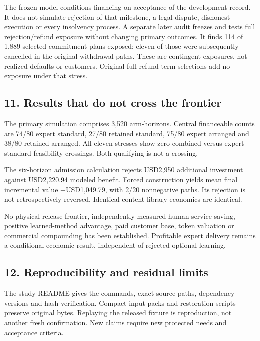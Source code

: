 \documentclass[
  10pt,
]{article}
\let\OriginalSubsection\subsection
\renewcommand{\subsection}{\needspace{6\baselineskip}\OriginalSubsection}
\begin{document}
The frozen model conditions financing on acceptance of the development
record. It does not simulate rejection of that milestone, a legal
dispute, dishonest execution or every insolvency process. A separate
later audit freezes and tests full rejection/refund exposure without
changing primary outcomes. It finds 114 of 1,889 selected commitment
plans exposed; eleven of those were subsequently cancelled in the
original withdrawal paths. These are contingent exposures, not realized
defaults or customers. Original full-refund-term selections add no
exposure under that stress.

\hypertarget{results-that-do-not-cross-the-frontier}{%
\subsection{11. Results that do not cross the
frontier}\label{results-that-do-not-cross-the-frontier}}

The primary simulation comprises 3,520 arm-horizons. Central financeable
counts are 74/80 expert standard, 27/80 retained standard, 75/80 expert
arranged and 38/80 retained arranged. All eleven stresses show zero
combined-versus-expert- standard feasibility crossings. Both qualifying
is not a crossing.

The six-horizon admission calculation rejects USD2,950 additional
investment against USD2,220.94 modeled benefit. Forced construction
yields mean final incremental value −USD1,049.79, with 2/20 nonnegative
paths. Its rejection is not retrospectively reversed. Identical-content
library economics are identical.

No physical-release frontier, independently measured human-service
saving, positive learned-method advantage, paid customer base, token
valuation or commercial compounding has been established. Profitable
expert delivery remains a conditional economic result, independent of
rejected optional learning.

\hypertarget{reproducibility-and-residual-limits}{%
\subsection{12. Reproducibility and residual
limits}\label{reproducibility-and-residual-limits}}

The study README gives the commands, exact source paths, dependency
versions and hash verification. Compact input packs and restoration
scripts preserve original bytes. Replaying the released fixture is
reproduction, not another fresh confirmation. New claims require new
protected needs and acceptance criteria.
\end{document}
